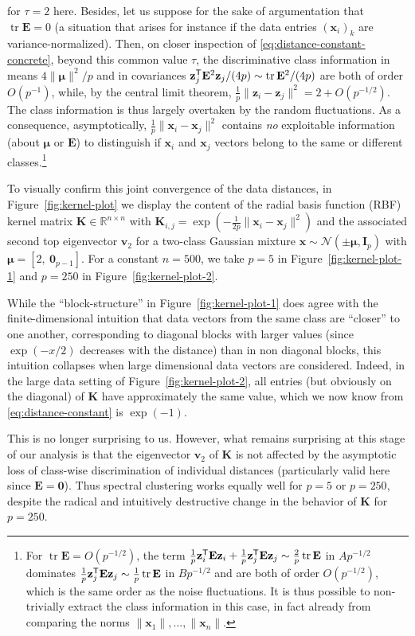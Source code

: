 \documentclass[MAL,biber]{nowfnt} %
\newcommand{\T}{{\sf T}}
\DeclareMathOperator{\tr}{tr}
\newcommand{\E}{{\mathbf{E}}}
\newcommand{\I}{{\mathbf{I}}}
\newcommand{\K}{{\mathbf{K}}}
\renewcommand{\v}{{\mathbf{v}}}
\newcommand{\x}{{\mathbf{x}}}
\newcommand{\z}{{\mathbf{z}}}
\newcommand{\bmu}{{ \boldsymbol{\mu} }}
\newcommand{\zo}{{\mathbf{0}}}
\newcommand{\RR}{{\mathbb{R}}}
\newcommand{\NN}{{\mathcal{N}}}
\begin{document}
for $\tau=2$ here. Besides, let us suppose for the sake of argumentation that $\tr\E=0$ (a situation that arises for instance if the data entries $(\x_i)_k$ are variance-normalized). Then, on closer inspection of \eqref{eq:distance-constant-concrete}, beyond this common value $\tau$, the discriminative class information in means $4\|\bmu\|^2/p$ and in covariances $\z_j^\T\E^2 \z_j/(4p)\sim \tr \E^2/(4p)$ are both of order $O(p^{-1})$, while, by the central limit theorem, $\frac1p\|\z_i-\z_j\|^2=2+O(p^{-1/2})$. The class information is thus largely overtaken by the random fluctuations. As a consequence, asymptotically, $\frac1p \| \x_i - \x_j \|^2$ contains \emph{no} exploitable information (about $\bmu$ or $\E$) to distinguish if $\x_i$ and $\x_j$ vectors belong to the same or different classes.\footnote{For $\tr\E=O(p^{-1/2})$, the term $\frac1p\z_i^\T\E\z_i+\frac1p\z_j^\T\E\z_j\sim \frac2p\tr\E$ in $Ap^{-1/2}$ dominates $\frac1p\z_j^\T\E\z_j\sim \frac1p\tr\E$ in $Bp^{-1/2}$ and are both of order $O(p^{-1/2})$, which is the same order as the noise fluctuations. It is thus possible to non-trivially extract the class information in this case, in fact already from comparing the norms $\|\x_1\|,\ldots,\|\x_n\|$.}

\medskip

To visually confirm this joint convergence of the data distances, in Figure~\ref{fig:kernel-plot} we display the content of the radial basis function (RBF) kernel matrix $\K\in\RR^{n\times n}$ with $\K_{i,j} = \exp\left(-\frac1{2p} \| \x_i - \x_j \|^2 \right)$ and the associated second top eigenvector $\v_2$ for a two-class Gaussian mixture $\x \sim \NN (\pm \bmu, \I_p)$ with $\bmu = [2,\ \zo_{p-1}]$. For a constant $n=500$, we take $p=5$ in Figure~\ref{fig:kernel-plot-1} and $p=250$ in Figure~\ref{fig:kernel-plot-2}. 

While the ``block-structure'' in Figure~\ref{fig:kernel-plot-1} does agree with the finite-dimensional intuition that data vectors from the same class are ``closer'' to one another, corresponding to diagonal blocks with larger values (since $\exp(-x/2)$ decreases with the distance) than in non diagonal blocks, this intuition collapses when large dimensional data vectors are considered. Indeed, in the large data setting of Figure~\ref{fig:kernel-plot-2}, all entries (but obviously on the diagonal) of $\K$ have approximately the same value, which we now know from \eqref{eq:distance-constant} is $\exp(-1)$.

This is no longer surprising to us. However, what remains surprising at this stage of our analysis is that the eigenvector $\v_2$ of $\K$ is not affected by the asymptotic loss of class-wise discrimination of individual distances (particularly valid here since $\E=\zo$). Thus spectral clustering works equally well for $p=5$ or $p=250$, despite the radical and intuitively destructive change in the behavior of $\K$ for $p=250$.
\end{document}
